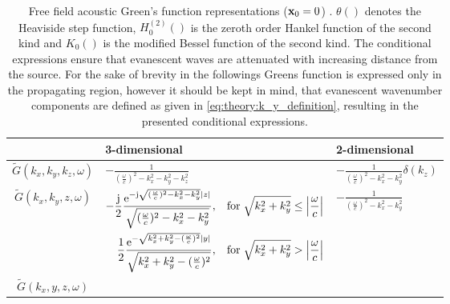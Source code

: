 \begin{table}[h!]
\caption{Free field acoustic Green's function representations ($\mathbf{x}_0 = 0$) \cite{Devaney2012, Duffy2001:Greens, Ahrens2010a, Ahrens2012, Gibson2008}.
$\theta\left( \right)$ denotes the Heaviside step function, $H_0^{(2)}\left( \right)$ is the zeroth order Hankel function of the second kind and $K_0
\left( \right)$ is the modified Bessel function of the second kind.
The conditional expressions ensure that evanescent waves are attenuated with increasing distance from the source. For the sake of brevity in the followings Greens function is expressed only in the propagating region, however it should be kept in mind, that evanescent wavenumber components are defined as given in \eqref{eq:theory:k_y_definition}, resulting in the presented conditional expressions.
}
\FloatBarrier
\renewcommand*{\arraystretch}{2.25}
\label{tab:theory:Greens_fun_representations} 
    \begin{tabular}[h!]{  c | | l |	 l }%
      & 3-dimensional & 2-dimensional \\ \hline
    $\tilde{G}(k_x,k_y,k_z,\omega)$ & $-\frac{1}{ \left(\frac{\omega}{c}\right)^2 - k_x^2-k_y^2-k_z^2} $ &  $-\frac{1}{\left(\frac{\omega}{c}\right)^2 - k_x^2-k_y^2}\delta(k_z)$ \\ 
    $\tilde{G}(k_x,k_y,z,\omega)$   &  
    \scriptsize	$\begin{aligned}[t]
	-\frac{\mathrm{j}}{2}\frac{\mathrm{e}^{-\mathrm{j}\sqrt{(\frac{\omega}{c})^2 - k_x^2 - k_y^2}|z|}}{\sqrt{(\frac{\omega}{c})^2 - k_x^2 - k_y^2}},\hspace{3mm} \text{for} \hspace{1mm}
	\sqrt{k_x^2+k_y^2}	\leq\left| \frac{\omega}{c} \right| \\
	\frac{1}{2}\frac{\mathrm{e}^{-\sqrt{k_x^2 + k_y^2-(\frac{\omega}{c})^2}|y|}}{\sqrt{k_x^2 + k_y^2-(\frac{\omega}{c})^2}},\hspace{3mm}  \text{for} \hspace{1mm}				\sqrt{k_x^2+k_y^2}>\left| 	\frac{\omega}{c} \right| 
	\end{aligned}$ \normalsize    
    &
	$-\frac{1}{\left(\frac{\omega}{c}\right)^2 - k_x^2-k_y^2}$
	\\
    $\tilde{G}(k_x,y,z,\omega)$

\end{tabular}
\end{table}
